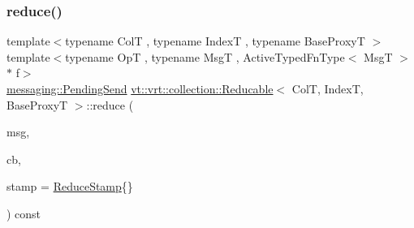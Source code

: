 \mbox{\label{structvt_1_1vrt_1_1collection_1_1_reducable_a6498376c8ae3532a626bc78005a0b3e3}} 
\subsubsection{\texorpdfstring{reduce()}{reduce()}\hspace{0.1cm}{\footnotesize\ttfamily [1/6]}}
{\footnotesize\ttfamily template$<$typename ColT , typename IndexT , typename Base\+ProxyT $>$ \\
template$<$typename OpT , typename MsgT , Active\+Typed\+Fn\+Type$<$ Msg\+T $>$ $\ast$ f$>$ \\
\hyperlink{structvt_1_1messaging_1_1_pending_send}{messaging\+::\+Pending\+Send} \hyperlink{structvt_1_1vrt_1_1collection_1_1_reducable}{vt\+::vrt\+::collection\+::\+Reducable}$<$ ColT, IndexT, Base\+ProxyT $>$\+::reduce (\begin{DoxyParamCaption}\item[{MsgT $\ast$const}]{msg,  }\item[{\hyperlink{namespacevt_a36db99df4c973d48b1118a293fff533f}{Callback}$<$ MsgT $>$}]{cb,  }\item[{\hyperlink{structvt_1_1vrt_1_1collection_1_1_reducable_a19f80baf23f36dad4948ef07322fd0cb}{Reduce\+Stamp}}]{stamp = {\ttfamily \hyperlink{structvt_1_1vrt_1_1collection_1_1_reducable_a19f80baf23f36dad4948ef07322fd0cb}{Reduce\+Stamp}\{\}} }\end{DoxyParamCaption}) const}

\mbox{\label{structvt_1_1vrt_1_1collection_1_1_reducable_a07fa6b35352b3c6ae05a210248601020}} 
